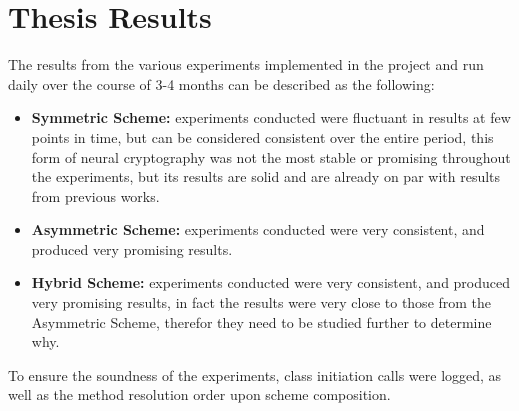 \documentclass[a4paper, 12pt]{report}
\begin{document}
\section{\textbf{Thesis Results}}
The results from the various experiments implemented in the project and run daily over the course of 3-4 months can be described as the following:
\begin{itemize}
	\item \textbf{Symmetric Scheme:} experiments conducted were fluctuant in results at few points in time, but can be considered consistent over the entire period, this form of neural cryptography was not the most stable or promising throughout the experiments, but its results are solid and are already on par with results from previous works.
	\item \textbf{Asymmetric Scheme:} experiments conducted were very consistent, and produced very promising results.
	\item \textbf{Hybrid Scheme:} experiments conducted were very consistent, and produced very promising results, in fact the results were very close to those from the Asymmetric Scheme, therefor they need to be studied further to determine why.
\end{itemize}
To ensure the soundness of the experiments, class initiation calls were logged, as well as the method resolution order upon scheme composition.
\end{document}
